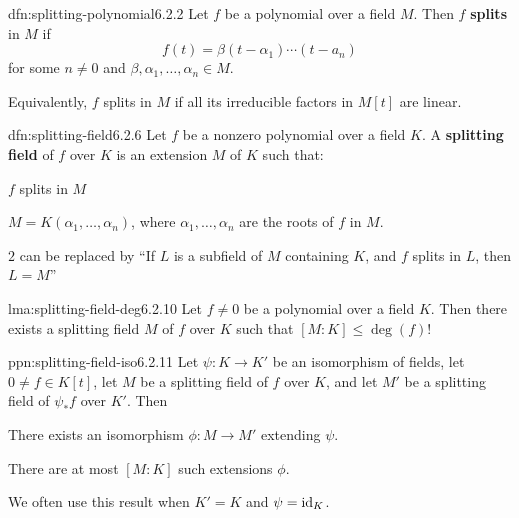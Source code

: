 \documentclass[landscape, 8pt]{extarticle}
\begin{document}
\begin{multicols}{3}
\begin{dfn}{dfn:splitting-polynomial}{6.2.2}
    Let $f$ be a polynomial over a field $M$. Then $f$ \textbf{splits} in $M$ if
    \[f(t) = \beta(t - \alpha_{1}) \cdots (t - a_{n})\]
    for some $n \ne 0$ and $\beta, \alpha_{1},\dots,\alpha_{n}\in M$.

    Equivalently, $f$ splits in $M$ if all its irreducible factors in $M[t]$ are linear.
\end{dfn}



\newpage
\begin{dfn}{dfn:splitting-field}{6.2.6}
    Let $f$ be a nonzero polynomial over a field $K$. A \textbf{splitting field} of $f$ over $K$ is an extension $M$ of $K$ such that:
    \begin{enumerate-tight}
        \item $f$ splits in $M$
        \item $M = K(\alpha_{1},\dots,\alpha_{n})$, where $\alpha_{1},\dots,\alpha_{n}$ are the roots of $f$ in $M$.
    \end{enumerate-tight}

    $2$ can be replaced by ``If $L$ is a subfield of $M$ containing $K$, and $f$ splits in $L$, then $L = M$''
\end{dfn}

\begin{lma}{lma:splitting-field-deg}{6.2.10}
    Let $f\ne 0$ be a polynomial over a field $K$. Then there exists a splitting field $M$ of $f$ over $K$ such that $[M : K] \le \deg(f)!$
\end{lma}

\begin{ppn}{ppn:splitting-field-iso}{6.2.11}
    Let $\psi : K \to K'$ be an isomorphism of fields, let $0 \ne f \in K[t]$, let $M$ be a splitting field of $f$ over $K$, and let $M'$ be a splitting field of $\psi_{\ast}f$ over $K'$. Then
    \begin{enumerate-tight}
        \item There exists an isomorphism $\phi : M \to M'$ extending $\psi$.
        \item There are at most $[M : K]$ such extensions $\phi$.
    \end{enumerate-tight}
    We often use this result when $K' = K$ and $\psi = \operatorname{id}_{K}$.
\end{ppn}


\end{multicols}
\end{document}

